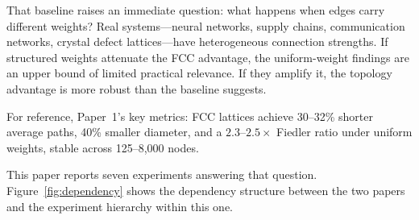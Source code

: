 \documentclass[11pt]{article}
\begin{document}
That baseline raises an immediate question: what happens when edges
carry different weights? Real systems---neural networks, supply
chains, communication networks, crystal defect lattices---have
heterogeneous connection strengths. If structured weights attenuate
the FCC advantage, the uniform-weight findings are an upper bound
of limited practical relevance. If they amplify it, the topology
advantage is more robust than the baseline suggests.

For reference, Paper~1's key metrics: FCC lattices achieve 30--32\%
shorter average paths, 40\% smaller diameter, and a
$2.3$--$2.5\times$ Fiedler ratio under uniform weights, stable across
125--8{,}000 nodes.

This paper reports seven experiments answering that question.
Figure~\ref{fig:dependency} shows the dependency structure between
the two papers and the experiment hierarchy within this one.
\end{document}
